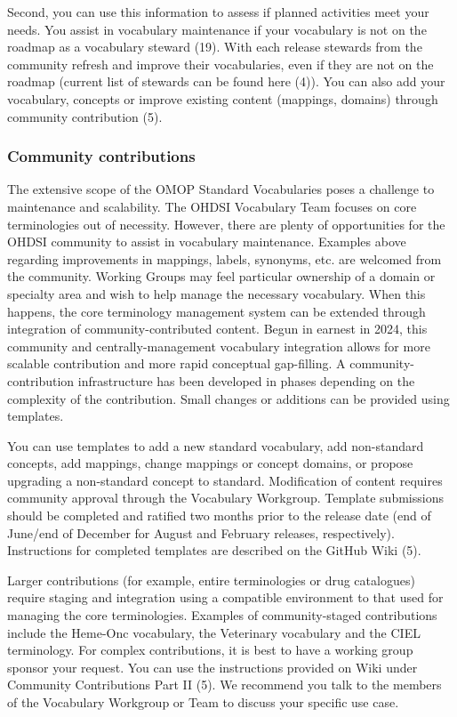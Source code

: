 \documentclass[
  letterpaper,
  paper=7in:10in,
  pagesize=pdftex,
  headinclude=on,
  footinclude=on,
  12pt]{scrbook}
\begin{document}
Second, you can use this information to assess if planned activities
meet your needs. You assist in vocabulary maintenance if your vocabulary
is not on the roadmap as a vocabulary steward (19). With each release
stewards from the community refresh and improve their vocabularies, even
if they are not on the roadmap (current list of stewards can be found
here (4)). You can also add your vocabulary, concepts or improve
existing content (mappings, domains) through community contribution (5).

\subsubsection{Community contributions}\label{community-contributions}

The extensive scope of the OMOP Standard Vocabularies poses a challenge
to maintenance and scalability. The OHDSI Vocabulary Team focuses on
core terminologies out of necessity. However, there are plenty of
opportunities for the OHDSI community to assist in vocabulary
maintenance. Examples above regarding improvements in mappings, labels,
synonyms, etc. are welcomed from the community. Working Groups may feel
particular ownership of a domain or specialty area and wish to help
manage the necessary vocabulary. When this happens, the core terminology
management system can be extended through integration of
community-contributed content. Begun in earnest in 2024, this community
and centrally-management vocabulary integration allows for more scalable
contribution and more rapid conceptual gap-filling. A
community-contribution infrastructure has been developed in phases
depending on the complexity of the contribution. Small changes or
additions can be provided using templates.

You can use templates to add a new standard vocabulary, add non-standard
concepts, add mappings, change mappings or concept domains, or propose
upgrading a non-standard concept to standard. Modification of content
requires community approval through the Vocabulary Workgroup. Template
submissions should be completed and ratified two months prior to the
release date (end of June/end of December for August and February
releases, respectively). Instructions for completed templates are
described on the GitHub Wiki (5).

Larger contributions (for example, entire terminologies or drug
catalogues) require staging and integration using a compatible
environment to that used for managing the core terminologies. Examples
of community-staged contributions include the Heme-Onc vocabulary, the
Veterinary vocabulary and the CIEL terminology. For complex
contributions, it is best to have a working group sponsor your request.
You can use the instructions provided on Wiki under Community
Contributions Part II (5). We recommend you talk to the members of the
Vocabulary Workgroup or Team to discuss your specific use case.
\end{document}
